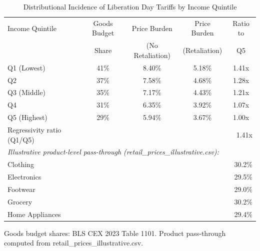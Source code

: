 \begin{table}[H]
\centering
\caption{Distributional Incidence of Liberation Day Tariffs by Income Quintile}
\label{tab:retail_incidence}
\begin{tabular}{lcccc}
\toprule
Income Quintile & Goods Budget & Price Burden & Price Burden & Ratio to \\
& Share & (No Retaliation) & (Retaliation) & Q5 \\
\midrule
Q1 (Lowest) & 41\% & 8.40\% & 5.18\% & 1.41x \\
Q2 & 37\% & 7.58\% & 4.68\% & 1.28x \\
Q3 (Middle) & 35\% & 7.17\% & 4.43\% & 1.21x \\
Q4 & 31\% & 6.35\% & 3.92\% & 1.07x \\
Q5 (Highest) & 29\% & 5.94\% & 3.67\% & 1.00x \\
\midrule
Regressivity ratio (Q1/Q5) & \multicolumn{4}{r}{1.41x} \\
\midrule
\multicolumn{5}{l}{\textit{Illustrative product-level pass-through (retail\_prices\_illustrative.csv):}} \\
\quad Clothing & \multicolumn{4}{r}{30.2\%} \\
\quad Electronics & \multicolumn{4}{r}{29.5\%} \\
\quad Footwear & \multicolumn{4}{r}{29.0\%} \\
\quad Grocery & \multicolumn{4}{r}{30.2\%} \\
\quad Home Appliances & \multicolumn{4}{r}{29.4\%} \\
\bottomrule
\end{tabular}
\begin{tablenotes}
\small
\item Goods budget shares: BLS CEX 2023 Table 1101. Product pass-through computed from retail\_prices\_illustrative.csv.
\end{tablenotes}
\end{table}